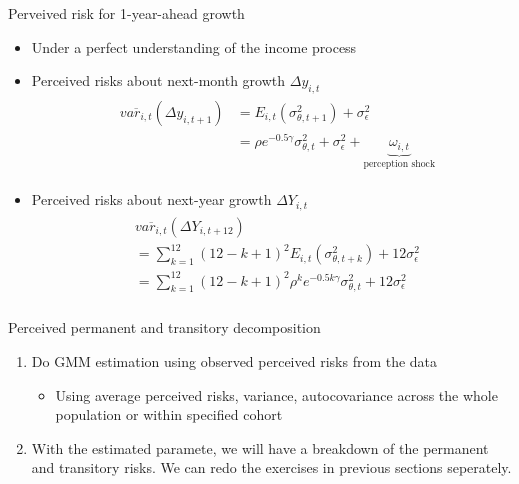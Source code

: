 \documentclass{beamer}
\begin{document}
\begin{frame}{Perveived risk for 1-year-ahead growth}
	\begin{itemize}
		\item Under a perfect understanding of the income process
	\end{itemize}
	\begin{itemize}
		\item Perceived risks about next-month growth $\Delta y_{i,t}$
		\begin{eqnarray*}
			\begin{split}
				& \overline {var_{i,t}}(\Delta y_{i,t+1}) & = E_{i,t}( {\sigma^2_{\theta,t+1}}) + \sigma^2_{\epsilon} \\
				& & = \rho e^{-0.5\gamma} \sigma^2_{\theta,t}  + \sigma^2_{\epsilon} + \underbrace{\omega_{i,t}}_{\text{perception shock}}
			\end{split}
		\end{eqnarray*}
		
		\item Perceived risks about next-year growth $\Delta Y_{i,t}$
		\begin{eqnarray*}
		\begin{split}
			& \overline {var_{i,t}}(\Delta Y_{i,t+12}) \\
			& = \sum^{12}_{k=1} (12-k+1)^2 E_{i,t}( {\sigma^2_{\theta,t+k}}) + 12 \sigma^2_{\epsilon}  \\ 
			& = \sum^{12}_{k=1} (12-k+1)^2 \rho^k e^{-0.5k\gamma} \sigma^2_{\theta,t}+ 12 \sigma^2_{\epsilon} \\ 	 
		\end{split}
	\end{eqnarray*}
	\end{itemize}
\end{frame}

\begin{frame}{Perceived permanent and transitory decomposition}
	\begin{enumerate}
	\item Do GMM estimation using observed perceived risks from the data 
	\begin{itemize}
     \item Using average perceived risks, variance, autocovariance across the whole population or within specified cohort
	\end{itemize}
\item	With the estimated paramete, we will have a breakdown of the permanent and transitory risks. We can redo the exercises in previous sections seperately. 
\end{enumerate}
\end{frame}
\end{document}
